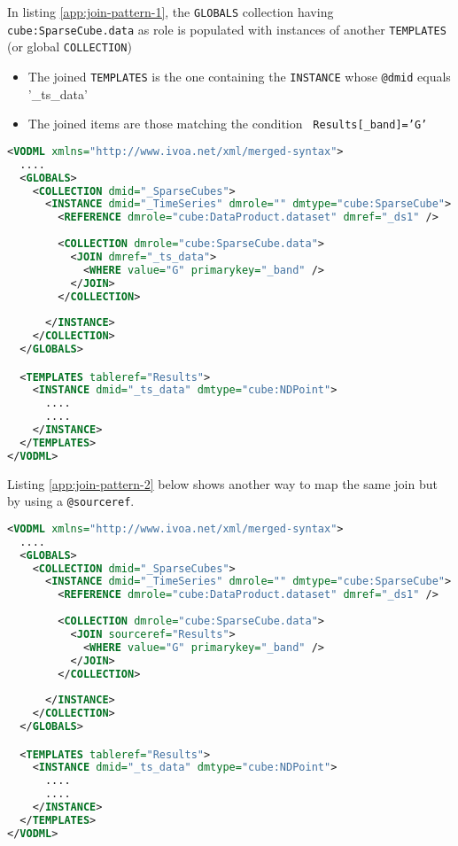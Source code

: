 
In listing \ref{app:join-pattern-1}, the \texttt{GLOBALS} collection having \texttt{cube:SparseCube.data} as role is populated with  instances of another \texttt{TEMPLATES} (or global \texttt{COLLECTION})
\begin{itemize}
  \item The joined \texttt{TEMPLATES} is the one containing the  \texttt{INSTANCE} whose \texttt{@dmid} equals '\_ts\_data'
  \item The joined items are those matching the condition  \texttt{ Results[\_band]='G'}
\end{itemize}

\begin{lstlisting}[label={app:join-pattern-1},caption={Joining a global \texttt{COLLECTION} with a \texttt{TEMPLATES}  identified by a  \texttt{(@dmid,@dmref)} pair.},language=XML]
<VODML xmlns="http://www.ivoa.net/xml/merged-syntax">
  ....
  <GLOBALS>
    <COLLECTION dmid="_SparseCubes">
      <INSTANCE dmid="_TimeSeries" dmrole="" dmtype="cube:SparseCube">
        <REFERENCE dmrole="cube:DataProduct.dataset" dmref="_ds1" />
        
        <COLLECTION dmrole="cube:SparseCube.data">
          <JOIN dmref="_ts_data">
            <WHERE value="G" primarykey="_band" />
          </JOIN>
        </COLLECTION>
        
      </INSTANCE>
    </COLLECTION>
  </GLOBALS>

  <TEMPLATES tableref="Results">
    <INSTANCE dmid="_ts_data" dmtype="cube:NDPoint">
      ....
      ....
    </INSTANCE>
  </TEMPLATES>
</VODML>
\end{lstlisting}  

Listing \ref{app:join-pattern-2} below shows another way to map the same join but by using a \texttt{@sourceref}.

\begin{lstlisting}[label={app:join-pattern-2},caption={Joining a global \texttt{COLLECTION} with a \texttt{TEMPLATES}  identified by a \texttt{@sourceref}.},language=XML]
<VODML xmlns="http://www.ivoa.net/xml/merged-syntax">
  ....
  <GLOBALS>
    <COLLECTION dmid="_SparseCubes">
      <INSTANCE dmid="_TimeSeries" dmrole="" dmtype="cube:SparseCube">
        <REFERENCE dmrole="cube:DataProduct.dataset" dmref="_ds1" />
        
        <COLLECTION dmrole="cube:SparseCube.data">
          <JOIN sourceref="Results">
            <WHERE value="G" primarykey="_band" />
          </JOIN>
        </COLLECTION>
        
      </INSTANCE>
    </COLLECTION>
  </GLOBALS>

  <TEMPLATES tableref="Results">
    <INSTANCE dmid="_ts_data" dmtype="cube:NDPoint">
      ....
      ....
    </INSTANCE>
  </TEMPLATES>
</VODML>
\end{lstlisting}  

